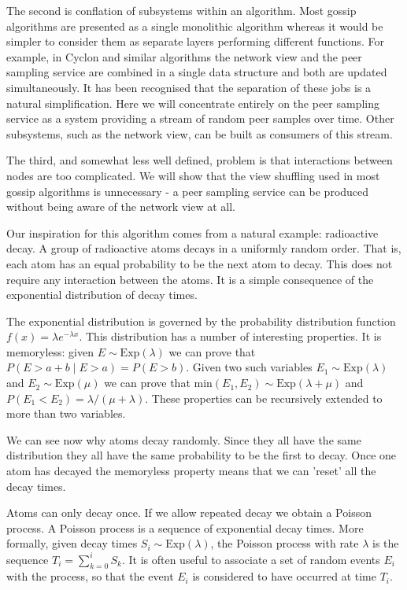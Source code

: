 \documentclass[a4paper,10pt]{article}
\begin{document}
The second is conflation of subsystems within an algorithm. Most gossip algorithms are presented as a single monolithic algorithm whereas it would be simpler to consider them as separate layers performing different functions. For example, in Cyclon and similar algorithms the network view and the peer sampling service are combined in a single data structure and both are updated simultaneously. It has been recognised \cite{pss, generic_theory} that the separation of these jobs is a natural simplification. Here we will concentrate entirely on the peer sampling service as a system providing a stream of random peer samples over time. Other subsystems, such as the network view, can be built as consumers of this stream.

The third, and somewhat less well defined, problem is that interactions between nodes are too complicated. We will show that the view shuffling used in most gossip algorithms is unnecessary - a peer sampling service can be produced without being aware of the network view at all.

Our inspiration for this algorithm comes from a natural example: radioactive decay. A group of radioactive atoms decays in a uniformly random order. That is, each atom has an equal probability to be the next atom to decay. This does not require any interaction between the atoms. It is a simple consequence of the exponential distribution of decay times.

The exponential distribution is governed by the probability distribution function $ f(x)=\lambda e ^ { - \lambda x } $. This distribution has a number of interesting properties. It is memoryless: given $ E \sim \text{Exp}(\lambda) $ we can prove that $ P(E>a+b \;|\; E>a) = P(E>b) $. Given two such variables $ E_1 \sim \text{Exp}(\lambda) $ and $ E_2 \sim \text{Exp}(\mu) $ we can prove that $ \text{min}(E_1,E_2) \sim \text{Exp}(\lambda + \mu) $ and $ P(E_1 < E_2) = \lambda / (\mu + \lambda) $. These properties can be recursively extended to more than two variables. 

We can see now why atoms decay randomly. Since they all have the same distribution they all have the same probability to be the first to decay. Once one atom has decayed the memoryless property means that we can 'reset' all the decay times.

Atoms can only decay once. If we allow repeated decay we obtain a Poisson process. A Poisson process is a sequence of exponential decay times. More formally, given decay times $S_i \sim \text{Exp}(\lambda) $, the Poisson process with rate $ \lambda $ is the sequence $ T_i = \sum_{k=0}^i S_k $. It is often useful to associate a set of random events $E_i$ with the process, so that the event $E_i$ is considered to have occurred at time $T_i$. 
\end{document}
